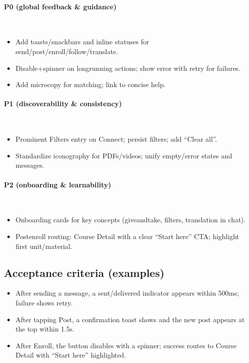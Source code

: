\documentclass[11pt,a4paper]{article}
\begin{document}
\paragraph{P0 (global feedback \& guidance)}~\\
\begin{itemize}[leftmargin=*]
  \item Add toasts/snackbars and inline statuses for send/post/enroll/follow/translate.
  \item Disable+spinner on long\-running actions; show error with retry for failures.
  \item Add micro\-copy for matching; link to concise help.
\end{itemize}

\paragraph{P1 (discoverability \& consistency)}~\\
\begin{itemize}[leftmargin=*]
  \item Prominent Filters entry on Connect; persist filters; add ``Clear all''.
  \item Standardize iconography for PDFs/videos; unify empty/error states and messages.
\end{itemize}

\paragraph{P2 (onboarding \& learnability)}~\\
\begin{itemize}[leftmargin=*]
  \item Onboarding cards for key concepts (give\-and\-take, filters, translation in chat).
  \item Post\-enroll routing: Course Detail with a clear ``Start here'' CTA; highlight first unit/material.
\end{itemize}

\subsection{Acceptance criteria (examples)}
\begin{itemize}[leftmargin=*]
  \item After sending a message, a sent/delivered indicator appears within 500ms; failure shows retry.
  \item After tapping Post, a confirmation toast shows and the new post appears at the top within 1.5s.
  \item After Enroll, the button disables with a spinner; success routes to Course Detail with ``Start here'' highlighted.
\end{itemize}
\end{document}
